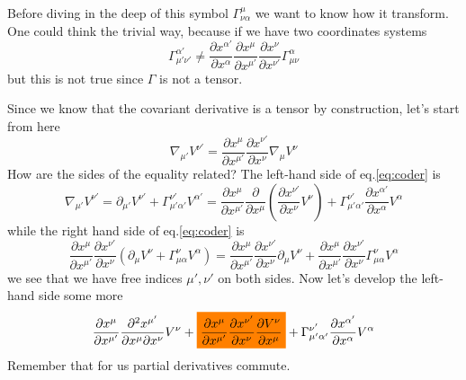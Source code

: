 Before diving in the deep of this symbol $\Gamma^{\mu }_{\nu \alpha }$ we want to know how it transform. One could think the trivial way, because if we have two coordinates systems \[
\Gamma^{\alpha '}_{\mu '\nu '} \neq \frac{\partial x^{\alpha '}}{\partial x^{\alpha }}  \frac{\partial x^{\mu }}{\partial x^{\mu '}} \frac{\partial x^{\nu }}{\partial x^{\nu '}} \Gamma ^{\alpha }_{\mu \nu } 
\]
but this is not true since $\Gamma $ is not a tensor.\par
Since we know that the covariant derivative is a tensor by construction, let's start from here
\begin{equation}\label{eq:coder}
\nabla _{\mu '}V^{\nu '} = \frac{\partial x^{\mu }}{\partial x^{\mu '}} \frac{\partial x^{\nu '}}{\partial x^{\nu }}  \nabla _{\mu }V^{\nu }
\end{equation}
How are the sides of the equality related?
The left-hand side of eq.\ref{eq:coder} is 
\begin{equation}
\nabla _{\mu '}V^{\nu '} = \partial_{\mu '}V^{\nu '} + \Gamma ^{\nu '}_{\mu '\alpha '} V^{\alpha '} = \frac{\partial x^{\mu }}{\partial x^{\mu '}} \frac{\partial }{\partial x^{\mu }} \left( \frac{\partial x^{\nu '}}{\partial x^{\nu }} V^{\nu } \right) + \Gamma ^{\nu '}_{\mu '\alpha '} \frac{\partial x^{\alpha '}}{\partial x^{\alpha }} V^{\alpha }
\end{equation}
while the right hand side of eq.\ref{eq:coder} is 
\begin{equation}
\frac{\partial x^{\mu }}{\partial x^{\mu '}} \frac{\partial x^{\nu '}}{\partial x^{\nu }} \left( \partial_{\mu }V^{\nu } + \Gamma ^{\nu }_{\mu \alpha } V^{\alpha } \right) = \frac{\partial x^{\mu }}{\partial x^{\mu '}} \frac{\partial x^{\nu '}}{\partial x^{\nu }} \partial_{\mu }V^{\nu } + \frac{\partial x^{\mu }}{\partial x^{\mu '}} \frac{\partial x^{\nu '}}{\partial x^{\nu }} \Gamma ^{\nu }_{\mu \alpha }V^{\alpha } 
\end{equation}
we see that we have free indices $\mu ', \nu '$	on both sides.
Now let's develop the left-hand side some more
\begin{equation}
	\frac{\partial x^{\mu }}{\partial x^{\mu '}} \frac{\partial ^{2}x^{\mu '}}{\partial x^{\mu }\partial x^{\nu }} V^{\nu } + \text{\colorbox{orange}{$ \frac{\partial x^{\mu }}{\partial x^{\mu '}} \frac{\partial x^{\nu '}}{\partial x^{\nu }} \frac{\partial V^{\nu }}{\partial x^{\mu }}$}} + \Gamma ^{\nu '}_{\mu '\alpha '} \frac{\partial x^{\alpha '}}{\partial x^{\alpha }}V^{\alpha }
\end{equation}
Remember that for us partial derivatives commute.\par
